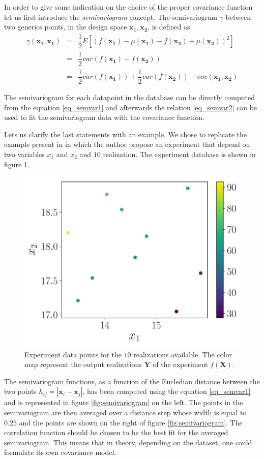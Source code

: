 In order to give some indication on the choice of the proper covariance function let us first introduce the \textit{semivariogram} concept.
The semivariogram $\gamma$ between two generics points, in the design space  $\mathbf{x_1}, \mathbf{x_2}$, is defined as:
\begin{eqnarray}
\gamma(\mathbf{x_1}, \mathbf{x_1}) &=& \dfrac{1}{2} E \left[  (f(\mathbf{x_1}) -\mu(\mathbf{x_1}) -f(\mathbf{x_2}) +\mu(\mathbf{x_2}))^2 \right] \label{eq_semvar1}\\
&=& \dfrac{1}{2} var(f(\mathbf{x_1}) -f(\mathbf{x_2}) ) \nonumber \\
&=& \dfrac{1}{2} var(f(\mathbf{x_1}))  +\dfrac{1}{2} var(f(\mathbf{x_2})) -cov(\mathbf{x_1}, \mathbf{x_2}) \label{eq_semvar2}
\end{eqnarray}

The semivariogram for each datapoint in the database can be directly computed from the equation \eqref{eq_semvar1} and afterwards the relation \eqref{eq_semvar2} can be used to fit the semivariogram data with the covariance function.

Lets us clarify the last statements with an example. We chose to replicate the example present in \citet{cavazzuti2012optimization} in which the author propose an experiment that depend on two variables $x_1$ and $x_2$ and $10$ realization. The experiment database is shown in figure \ref{fig:doedata}.

\begin{figure}[t]
	\centering
	\includegraphics[width=0.5\linewidth]{appendix_a/DOE_data}
	\caption{Experiment data points for the $10$ realizations available. The color map represent the output realizations  $\mathbf{Y}$ of the experiment $f(\mathbf{X})$.}
	\label{fig:doedata}
\end{figure}

The semivariogram functions, as a function of the Eucledian distance between the two points $h_{ij} = |\mathbf{x}_i - \mathbf{x}_j|$, has been computed using the equation \eqref{eq_semvar1} and is represented in figure \ref{fig:semivariogram} on the left. The points in the semivariogram are then averaged over a distance step whose width is equal to $0.25$ and the points are shown on the right of figure \ref{fig:semivariogram}.
The correlation function should be chosen to be the best fit for the averaged semivariogram. This means that in theory, depending on the dataset, one could formulate its own covariance model.


